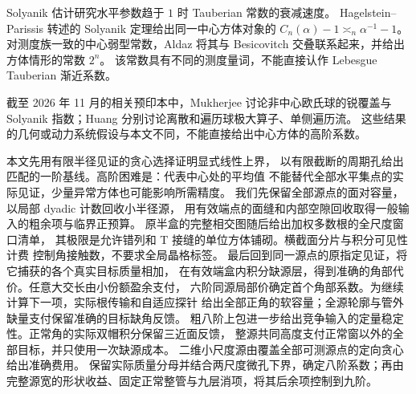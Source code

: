 \documentclass[UTF8,11pt,fontset=none]{ctexart}
\theoremstyle{remark}
\newcommand{\Cn}{C_n}
\begin{document}
Solyanik 估计研究水平参数趋于 \(1\) 时 Tauberian 常数的衰减速度。
Hagelstein--Parissis \cite[Theorem 1]{HagelsteinParissis2014}
转述的 Solyanik 定理给出同一中心方体对象的
\(\Cn(\alpha)-1\asymp_n\alpha^{-1}-1\)。
对测度族一致的中心弱型常数，Aldaz
\cite[Theorems 1.2, 2.10 and Corollary 3.5]{Aldaz2020}
将其与 Besicovitch 交叠联系起来，并给出方体情形的常数 \(2^n\)。
该常数具有不同的测度量词，不能直接认作 Lebesgue Tauberian 渐近系数。

截至 2026 年 11 月的相关预印本中，Mukherjee \cite{Mukherjee2026Covering}
讨论非中心欧氏球的锐覆盖与 Solyanik 指数；Huang
\cite{Huang2026Discrete,Huang2026Flows} 分别讨论离散和遍历球极大算子、单侧遍历流。
这些结果的几何或动力系统假设与本文不同，不能直接给出中心方体的高阶系数。

本文先用有限半径见证的贪心选择证明显式线性上界，
以有限截断的周期孔给出匹配的一阶基线。高阶困难是：代表中心处的平均值
不能替代全部水平集点的实际见证，少量异常方体也可能影响所需精度。
我们先保留全部源点的面对容量，以局部 dyadic 计数回收小半径源，
用有效端点的面缝和内部空隙回收取得一般输入的粗余项与临界正预算。
原半盒的完整相交图随后给出加权多数根的全尺度窗口清单，
其极限是允许错列和 T 接缝的单位方体铺砌。横截面分片与积分可见性计费
控制角接触数，不要求全局晶格标签。
最后回到同一源点的原指定见证，将它捕获的各个真实目标质量相加，
在有效端盒内积分缺源层，得到准确的角部代价。任意大交长由小份额盈余支付，
六阶同源局部价确定首个角部系数。为继续计算下一项，实际根传输和自适应探针
给出全部正角的软容量；全源轮廓与管外缺量支付保留准确的目标缺角反馈。
粗八阶上包进一步给出竞争输入的定量稳定性。正常角的实际双帽积分保留三近面反馈，
整源共同高度支付正常窗以外的全部目标，并只使用一次缺源成本。
二维小尺度源由覆盖全部可测源点的定向贪心给出准确费用。
保留实际质量分母并结合两尺度微孔下界，确定八阶系数；再由完整源宽的形状收益、固定正常整管与九层消项，将其后余项控制到九阶。
\end{document}
